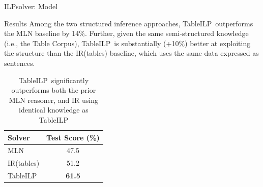 \documentclass[final]{beamer}
\newlength{\onecolwid}
\newlength{\twocolwid}
\newcommand{\tableilp}{TableILP}
\newcommand\lucene{IR}
\newcommand\praline{MLN}
\begin{document}
\begin{frame}[t]
\begin{columns}[t]
\begin{column}{\twocolwid}
\begin{columns}[t,totalwidth=\twocolwid]
\begin{column}{\onecolwid}
\begin{block}{ILPsolver: Model}
\end{block}

\begin{block}{Results}
	Among the two structured inference approaches, \tableilp\ outperforms the MLN baseline by 14\%. Further, given the same semi-structured knowledge (i.e., the Table Corpus), \tableilp\ is substantially (+10\%) better at exploiting the structure than the \lucene(tables) baseline,  which uses the same data expressed as sentences.
	
	\begin{table}[htb]
		\begin{tabular}{l|c}
			Solver & Test Score (\%) \\
			\hline\hline %
			\praline & 47.5 \\
			\lucene (tables) & 51.2 \\
			\tableilp & {\bf 61.5} \\
			\hline
		\end{tabular}
		\caption{\small \tableilp~significantly outperforms both the prior MLN reasoner, and IR using identical knowledge as \tableilp}
		\label{tab:eval}
	\end{table}
\end{block}


\end{column} %

\end{columns} %


\end{column}
\end{columns}
\end{frame}
\end{document}

